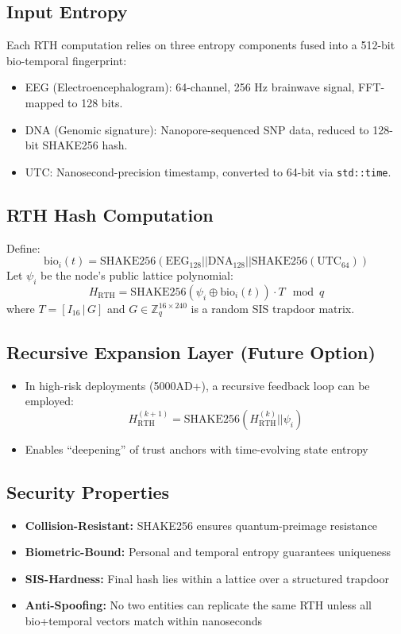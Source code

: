 \documentclass[12pt]{article}
\begin{document}
\subsection*{Input Entropy}

Each RTH computation relies on three entropy components fused into a 512-bit bio-temporal fingerprint:

\begin{itemize}
    \item EEG (Electroencephalogram): 64-channel, 256 Hz brainwave signal, FFT-mapped to 128 bits.
    \item DNA (Genomic signature): Nanopore-sequenced SNP data, reduced to 128-bit SHAKE256 hash.
    \item UTC: Nanosecond-precision timestamp, converted to 64-bit via \texttt{std::time}.
\end{itemize}

\subsection*{RTH Hash Computation}

Define:
\[
\text{bio}_i(t) = \text{SHAKE256}(\text{EEG}_{128} || \text{DNA}_{128} || \text{SHAKE256}(\text{UTC}_{64}))
\]
Let \( \psi_i \) be the node's public lattice polynomial:
\[
H_{\text{RTH}} = \text{SHAKE256}(\psi_i \oplus \text{bio}_i(t)) \cdot T \mod q
\]
where \( T = [I_{16} \,|\, G] \) and \( G \in \mathbb{Z}_q^{16 \times 240} \) is a random SIS trapdoor matrix.

\subsection*{Recursive Expansion Layer (Future Option)}

\begin{itemize}
    \item In high-risk deployments (5000AD+), a recursive feedback loop can be employed:
    \[
    H_{\text{RTH}}^{(k+1)} = \text{SHAKE256}(H_{\text{RTH}}^{(k)} || \psi_i)
    \]
    \item Enables “deepening” of trust anchors with time-evolving state entropy
\end{itemize}

\subsection*{Security Properties}

\begin{itemize}
    \item \textbf{Collision-Resistant:} SHAKE256 ensures quantum-preimage resistance
    \item \textbf{Biometric-Bound:} Personal and temporal entropy guarantees uniqueness
    \item \textbf{SIS-Hardness:} Final hash lies within a lattice over a structured trapdoor
    \item \textbf{Anti-Spoofing:} No two entities can replicate the same RTH unless all bio+temporal vectors match within nanoseconds
\end{itemize}
\end{document}
